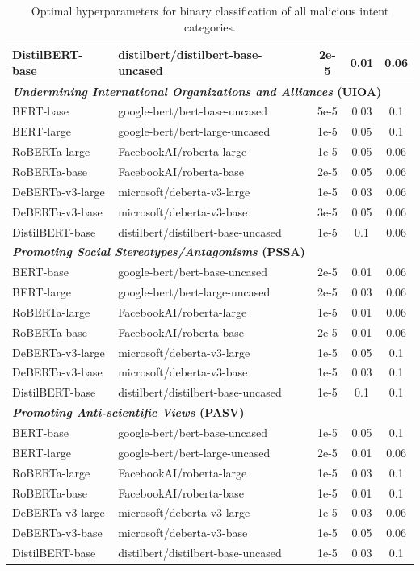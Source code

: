 \documentclass[11pt]{article}
\begin{document}
\begin{table}[ht]
\begin{tabular}{llccc}
DistilBERT-base & distilbert/distilbert-base-uncased & 2e-5 & 0.01 & 0.06 \\
\midrule
\multicolumn{5}{l}{\textbf{\textit{Undermining International Organizations and Alliances} (UIOA)}} \\
\midrule
BERT-base & google-bert/bert-base-uncased & 5e-5 & 0.03 & 0.1 \\
BERT-large & google-bert/bert-large-uncased & 1e-5 & 0.05 & 0.1 \\
RoBERTa-large & FacebookAI/roberta-large & 1e-5 & 0.05 & 0.06 \\
RoBERTa-base & FacebookAI/roberta-base & 2e-5 & 0.05 & 0.06 \\
DeBERTa-v3-large & microsoft/deberta-v3-large & 1e-5 & 0.03 & 0.06 \\
DeBERTa-v3-base & microsoft/deberta-v3-base & 3e-5 & 0.05 & 0.06 \\
DistilBERT-base & distilbert/distilbert-base-uncased & 1e-5 & 0.1 & 0.06 \\
\midrule
\multicolumn{5}{l}{\textbf{\textit{Promoting Social Stereotypes/Antagonisms} (PSSA)}} \\
\midrule
BERT-base & google-bert/bert-base-uncased & 2e-5 & 0.01 & 0.06 \\
BERT-large & google-bert/bert-large-uncased & 2e-5 & 0.03 & 0.06 \\
RoBERTa-large & FacebookAI/roberta-large & 1e-5 & 0.01 & 0.06 \\
RoBERTa-base & FacebookAI/roberta-base & 2e-5 & 0.01 & 0.06 \\
DeBERTa-v3-large & microsoft/deberta-v3-large & 1e-5 & 0.05 & 0.1 \\
DeBERTa-v3-base & microsoft/deberta-v3-base & 1e-5 & 0.03 & 0.1 \\
DistilBERT-base & distilbert/distilbert-base-uncased & 1e-5 & 0.1 & 0.1 \\
\midrule
\multicolumn{5}{l}{\textbf{\textit{Promoting Anti-scientific Views} (PASV)}} \\
\midrule
BERT-base & google-bert/bert-base-uncased & 1e-5 & 0.05 & 0.1 \\
BERT-large & google-bert/bert-large-uncased & 2e-5 & 0.01 & 0.06 \\
RoBERTa-large & FacebookAI/roberta-large & 1e-5 & 0.03 & 0.1 \\
RoBERTa-base & FacebookAI/roberta-base & 1e-5 & 0.01 & 0.1 \\
DeBERTa-v3-large & microsoft/deberta-v3-large & 1e-5 & 0.03 & 0.06 \\
DeBERTa-v3-base & microsoft/deberta-v3-base & 1e-5 & 0.05 & 0.06 \\
DistilBERT-base & distilbert/distilbert-base-uncased & 1e-5 & 0.03 & 0.1 \\
\bottomrule
\end{tabular}
\caption{Optimal hyperparameters for binary classification of all malicious intent categories.}
\label{tab:hyperparams_binary_ucpi_cpv_uioa_pssa_pasv}
\end{table}
\end{document}

